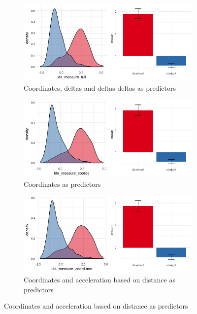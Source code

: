 \documentclass{article}
\begin{document}
\begin{itemize}
\begin{figure}[h]
\begin{subfigure}{0.3\textwidth}
\includegraphics[width=\textwidth]{ldafull.png}
\caption{Coordinates, deltas and deltas-deltas as predictors}
\end{subfigure}
\begin{subfigure}{0.3\textwidth}
\includegraphics[width=\textwidth]{ldacoords.png}
\caption{Coordinates as predictors}
\end{subfigure}
\begin{subfigure}{0.3\textwidth}
\includegraphics[width=\textwidth]{ldacoordsacc.png}
\caption{Coordinates and acceleration based on distance as predictors}
\end{subfigure}


\end{figure}
\end{itemize}
\end{document}
